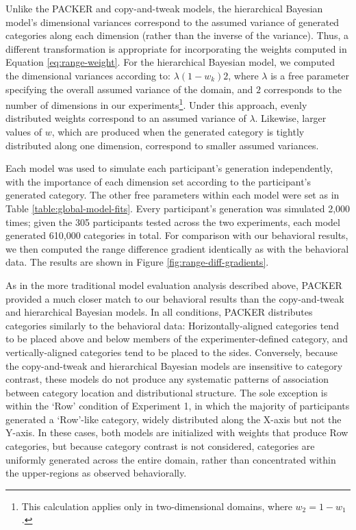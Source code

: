 \documentclass[12pt]{article}
\begin{document}
\begin{flushleft}
Unlike the PACKER and copy-and-tweak models, the hierarchical Bayesian model's dimensional variances correspond to the assumed variance of generated categories along each dimension (rather than the inverse of the variance). Thus, a different transformation is appropriate for incorporating the weights computed in Equation \ref{eq:range-weight}. For the hierarchical Bayesian model, we computed the dimensional variances according to: $\lambda (1-w_k) 2$, where $\lambda$ is a free parameter specifying the overall assumed variance of the domain, and $2$ corresponds to the number of dimensions in our experiments\footnote{This calculation applies only in two-dimensional domains, where $w_2 = 1-w_1$.}. Under this approach, evenly distributed weights correspond to an assumed variance of $\lambda$. Likewise, larger values of $w$, which are produced when the generated category is tightly distributed along one dimension, correspond to smaller assumed variances. 

Each model was used to simulate each participant's generation independently, with the importance of each dimension set according to the participant's generated category. The other free parameters within each model were set as in Table \ref{table:global-model-fits}. Every participant's generation was simulated 2,000 times; given the 305 participants tested across the two experiments, each model generated 610,000 categories in total. For comparison with our behavioral results, we then computed the range difference gradient identically as with the behavioral data. The results are shown in Figure \ref{fig:range-diff-gradients}.

As in the more traditional model evaluation analysis described above, PACKER provided a much closer match to our behavioral results than the copy-and-tweak and hierarchical Bayesian models. In all conditions, PACKER distributes categories similarly to the behavioral data: Horizontally-aligned categories tend to be placed above and below members of the experimenter-defined category, and vertically-aligned categories tend to be placed to the sides. Conversely, because the copy-and-tweak and hierarchical Bayesian models are insensitive to category contrast, these models do not produce any systematic patterns of association between category location and distributional structure. The sole exception is within the `Row' condition of Experiment 1, in which the majority of participants generated a `Row'-like category, widely distributed along the X-axis but not the Y-axis. In these cases, both models are initialized with weights that produce Row categories, but because category contrast is not considered, categories are uniformly generated across the entire domain, rather than concentrated within the upper-regions as observed behaviorally.


\end{flushleft}
\end{document}
